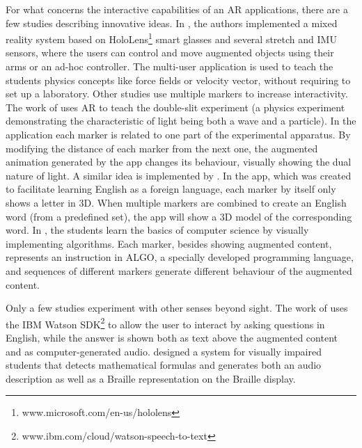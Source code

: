 For what concerns the interactive capabilities of an AR applications, there are a few studies describing innovative ideas. In \citep{khan2018mathland}, the authors implemented a mixed reality system based on HoloLens\footnote{www.microsoft.com/en-us/hololens} smart glasses and several stretch and \gls{IMU} sensors, where the users can control and move augmented objects using their arms or an ad-hoc controller. The multi-user application is used to teach the students physics concepts like force fields or velocity vector, without requiring to set up a laboratory.
Other studies use multiple markers to increase interactivity. The work of  \citet{wang2018augmented} uses AR to teach the double-slit experiment (a physics experiment demonstrating the characteristic of light being both a wave and a particle). In the application each marker is related to one part of the experimental apparatus. By modifying the distance of each marker from the next one, the augmented animation generated by the app changes its behaviour, visually showing the dual nature of light.
A similar idea is implemented by \citet{boonbrahm2015using}. In the app, which was created to facilitate learning English as a foreign language, each marker by itself only shows a letter in 3D. When multiple markers are combined to create an English word (from a predefined set), the app will show a 3D model of the corresponding word.
In \citep{gardeli2018effect}, the students learn the basics of computer science by visually implementing algorithms. Each marker, besides showing augmented content, represents an instruction in ALGO, a specially developed programming language, and sequences of different markers generate different behaviour of the augmented content.

Only a few studies experiment with other senses beyond sight. The work of \citet{kenoui2020teach} uses the IBM Watson SDK\footnote{www.ibm.com/cloud/watson-speech-to-text} to allow the user to interact by asking questions in English, while the answer is shown both as text above the augmented content and as computer-generated audio. \citet{mikulowski2020multi} designed a system for visually impaired students that detects mathematical formulas and generates both an audio description as well as a Braille representation on the Braille display.
 
